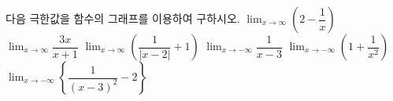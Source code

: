 다음 극한값을 함수의 그래프를 이용하여 구하시오.
 $\displaystyle\lim_{x\to\infty}\left(2-\dfrac{1}{x}\right)$
 $\displaystyle\lim_{x\to\infty}\dfrac{3x}{x+1}$
 $\displaystyle\lim_{x\to\infty}\left(\dfrac{1}{|x-2|}+1\right)$
 $\displaystyle\lim_{x\to -\infty}\dfrac{1}{x-3}$
 $\displaystyle\lim_{x\to -\infty}\left(1+\dfrac{1}{x^2}\right)$
 $\displaystyle\lim_{x\to -\infty}\left\{\dfrac{1}{(x-3)^2}-2\right\}$
